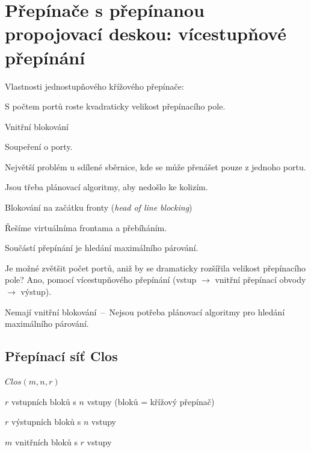 \section{Přepínače s přepínanou propojovací deskou: vícestupňové přepínání}

Vlastnosti jednostupňového křížového přepínače:
\begin{compactitem}
    \item S počtem portů roste kvadraticky velikost přepínacího pole.
    \item Vnitřní blokování \begin{compactitem}
        \item Soupeření o porty.
        \item Největší problém u sdílené sběrnice, kde se může přenášet pouze z jednoho portu.
        \item Jsou třeba plánovací algoritmy, aby nedošlo ke kolizím.
    \end{compactitem}
    \item Blokování na začátku fronty (\textit{head of line blocking}) \begin{compactitem}
        \item Řešíme virtuálníma frontama a přebíháním.
    \end{compactitem}
    \item Součástí přepínání je hledání maximálního párování.
\end{compactitem}

\noindent Je možné zvětšit počet portů, aniž by se dramaticky rozšířila velikost přepínacího pole? Ano, pomocí vícestupňového přepínání (vstup $\rightarrow$ vnitřní přepínací obvody $\rightarrow$ výstup).
\begin{compactitem}
    \item Nemají vnitřní blokování~--~Nejsou potřeba plánovací algoritmy pro hledání maximálního párování.
\end{compactitem}

\subsection{Přepínací síť Clos}

$Clos(m, n, r)$
\begin{compactitem}
    \item $r$ vstupních bloků s $n$ vstupy (bloků = křížový přepínač)
    \item $r$ výstupních bloků s $n$ vstupy
    \item $m$ vnitřních bloků s $r$ vstupy
\end{compactitem}

